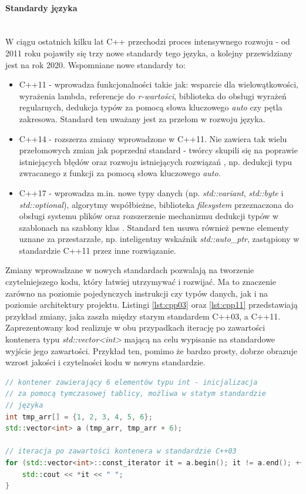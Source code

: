 \paragraph*{Standardy języka}\mbox{} \\
W ciągu ostatnich kilku lat C++ przechodzi proces intensywnego rozwoju - od 2011 roku pojawiły się trzy nowe standardy tego języka, a kolejny przewidziany jest na rok 2020. Wspomniane nowe standardy to:
\begin{itemize}
\item C++11 - wprowadza funkcjonalności takie jak: wsparcie dla wielowątkowości, wyrażenia lambda, referencje do \textit{r-wartości}, biblioteka do obsługi wyrażeń regularnych, dedukcja typów za pomocą słowa kluczowego \textit{auto} czy pętla zakresowa. Standard ten uważany jest za przełom w rozwoju języka.
\item C++14 - rozszerza zmiany wprowadzone w C++11. Nie zawiera tak wielu przełomowych zmian jak poprzedni standard - twórcy skupili się na poprawie istniejących błędów oraz rozwoju istniejących rozwiązań \cite{Cpp14Wikipedia}, np. dedukcji typu zwracanego z funkcji za pomocą słowa kluczowego \textit{auto}.
\item C++17 - wprowadza m.in. nowe typy danych (np. \textit{std::variant}, \textit{std::byte} i \textit{std::optional}), algorytmy współbieżne, biblioteka \textit{filesystem} przeznaczona do obsługi systemu plików oraz rozszerzenie mechanizmu dedukcji typów w szablonach na szablony klas \cite{BartekCodingBlogCpp17}. Standard ten usuwa również pewne elementy uznane za przestarzałe, np. inteligentny wskaźnik \textit{std::auto\_ptr}, zastąpiony w standardzie C++11 przez inne rozwiązanie.
\end{itemize} 
Zmiany wprowadzane w nowych standardach pozwalają na tworzenie czytelniejszego kodu, który łatwiej utrzymywać i rozwijać. Ma to znaczenie zarówno na poziomie pojedynczych instrukcji czy typów danych, jak i na poziomie architektury projektu. Listingi \ref{lst:cpp03} oraz \ref{lst:cpp11} przedstawiają przykład zmiany, jaka zaszła między starym standardem C++03, a C++11. Zaprezentowany kod realizuje w obu przypadkach iterację po zawartości kontenera typu \textit{std::vector<int>} mającą na celu wypisanie na standardowe wyjście jego zawartości. Przykład ten, pomimo że bardzo prosty, dobrze obrazuje wzrost jakości i czytelności kodu w nowym standardzie.

\begin{lstlisting}[language=c++,caption={Przykład kodu w języku C++ napisany z wykorzystaniem standardu C++03},label={lst:cpp03}]
// kontener zawierający 6 elementów typu int - inicjalizacja
// za pomocą tymczasowej tablicy, możliwa w statym standardzie
// języka
int tmp_arr[] = {1, 2, 3, 4, 5, 6};
std::vector<int> a (tmp_arr, tmp_arr + 6);

// iteracja po zawartości kontenera w standardzie C++03
for (std::vector<int>::const_iterator it = a.begin(); it != a.end(); ++it) {
    std::cout << *it << " ";
}
\end{lstlisting}


